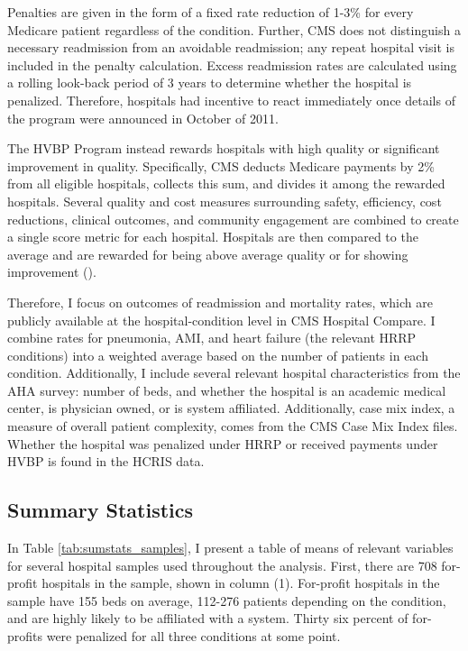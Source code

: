 \documentclass[12pt]{article}
\begin{document}
    Penalties are given in the form of a fixed rate reduction of 1-3\% for every Medicare patient regardless of the condition. Further, CMS does not distinguish a necessary readmission from an avoidable readmission; any repeat hospital visit is included in the penalty calculation. Excess readmission rates are calculated using a rolling look-back period of 3 years to determine whether the hospital is penalized. Therefore, hospitals had incentive to react immediately once details of the program were announced in October of 2011. 

    The HVBP Program instead rewards hospitals with high quality or significant improvement in quality. Specifically, CMS deducts Medicare payments by 2\% from all eligible hospitals, collects this sum, and divides it among the rewarded hospitals. Several quality and cost measures surrounding safety, efficiency, cost reductions, clinical outcomes, and community engagement are combined to create a single score metric for each hospital. Hospitals are then compared to the average and are rewarded for being above average quality or for showing improvement (\cite{CMS_2023}). 

    Therefore, I focus on outcomes of readmission and mortality rates, which are publicly available at the hospital-condition level in CMS Hospital Compare. I combine rates for pneumonia, AMI, and heart failure (the relevant HRRP conditions) into a weighted average based on the number of patients in each condition. Additionally, I include several relevant hospital characteristics from the AHA survey: number of beds, and whether the hospital is an academic medical center, is physician owned, or is system affiliated. Additionally, case mix index, a measure of overall patient complexity, comes from the CMS Case Mix Index files. Whether the hospital was penalized under HRRP or received payments under HVBP is found in the HCRIS data. 

	\subsection{Summary Statistics}\label{sec:data}

    In Table \ref{tab:sumstats_samples}, I present a table of means of relevant variables for several hospital samples used throughout the analysis. First, there are 708 for-profit hospitals in the sample, shown in column (1). For-profit hospitals in the sample have 155 beds on average, 112-276 patients depending on the condition, and are highly likely to be affiliated with a system. Thirty six percent of for-profits were penalized for all three conditions at some point. 
\end{document}
